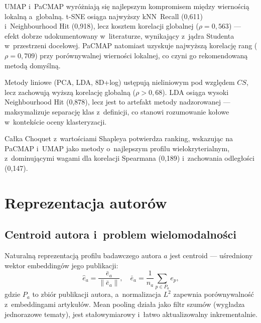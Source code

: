 \documentclass[a4paper,11pt,twocolumn]{article}
\begin{document}
UMAP i~PaCMAP wyróżniają się najlepszym kompromisem między wiernością
lokalną a~globalną. t-SNE osiąga najwyższy kNN~Recall (0,611) i~Neighbourhood
Hit (0,918), lecz kosztem korelacji globalnej ($\rho=0{,}563$) ---
efekt dobrze udokumentowany w~literaturze, wynikający z~jądra Studenta
w~przestrzeni docelowej. PaCMAP natomiast uzyskuje najwyższą korelację
rang ($\rho=0{,}709$) przy porównywalnej wierności lokalnej, co czyni go
rekomendowaną metodą domyślną.


Metody liniowe (PCA, LDA, 8D+log) ustępują nieliniowym pod względem
$CS$, lecz zachowują wyższą korelację globalną ($\rho > 0{,}68$).
LDA osiąga wysoki Neighbourhood Hit (0,878), lecz jest to artefakt
metody nadzorowanej --- maksymalizuje separację klas z~definicji,
co stanowi rozumowanie kołowe w~kontekście oceny klasteryzacji.

Całka Choquet z~wartościami Shapleya potwierdza ranking, wskazując
na PaCMAP i~UMAP jako metody o~najlepszym profilu wielokryterialnym,
z~dominującymi wagami dla korelacji Spearmana (0,189) i~zachowania
odległości (0,147).


%             

\section{Reprezentacja autorów}
\label{sec:author}


\subsection{Centroid autora i~problem wielomodalności}

Naturalną reprezentacją profilu badawczego autora $a$ jest centroid ---
uśredniony wektor embeddingów jego publikacji:
\begin{equation}
  \hat{e}_a = \frac{\bar{e}_a}{\|\bar{e}_a\|}, \quad
  \bar{e}_a = \frac{1}{n_a}\sum_{p \in P_a} e_p,
  \label{eq:centroid}
\end{equation}
gdzie $P_a$ to zbiór publikacji autora, a~normalizacja $L^2$
zapewnia porównywalność z~embeddingami artykułów. Mean pooling
działa jako filtr szumów (wygładza jednorazowe tematy), jest
stałowymiarowy i~łatwo aktualizowalny inkrementalnie.
\end{document}
